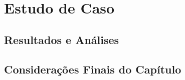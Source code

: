     \chapter{Estudo de Caso}
        \label{cap:estudo-de-caso}
    \section{Resultados e Análises}
    \section{Considerações Finais do Capítulo}
